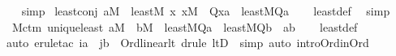 \begin{isabellebody}
\ \ \isamarkupfalse%
\ simp%
\endisatagproof
{\isafoldproof}%
%
\isadelimproof
\isanewline
%
\endisadelimproof
\isanewline
{}\isamarkupfalse%
\ least{\isacharunderscore}{\kern0pt}conj{\isacharcolon}{\kern0pt}\ {\isachardoublequoteopen}a{\isasymin}M\ {\isasymLongrightarrow}\ least{\isacharparenleft}{\kern0pt}{\isacharhash}{\kern0pt}{\isacharhash}{\kern0pt}M{\isacharcomma}{\kern0pt}\ {\isasymlambda}x{\isachardot}{\kern0pt}\ x{\isasymin}M\ {\isasymand}\ Q{\isacharparenleft}{\kern0pt}x{\isacharparenright}{\kern0pt}{\isacharcomma}{\kern0pt}a{\isacharparenright}{\kern0pt}\ {\isasymlongleftrightarrow}\ least{\isacharparenleft}{\kern0pt}{\isacharhash}{\kern0pt}{\isacharhash}{\kern0pt}M{\isacharcomma}{\kern0pt}Q{\isacharcomma}{\kern0pt}a{\isacharparenright}{\kern0pt}{\isachardoublequoteclose}\isanewline
%
\isadelimproof
\ \ %
\endisadelimproof
%
\isatagproof
{}\isamarkupfalse%
\ least{\isacharunderscore}{\kern0pt}def\ \isamarkupfalse%
\ simp%
\endisatagproof
{\isafoldproof}%
%
\isadelimproof
\isanewline
%
\endisadelimproof
\isanewline
\isanewline
{}\isamarkupfalse%
\ {\isacharparenleft}{\kern0pt}\ M{\isacharunderscore}{\kern0pt}ctm{\isacharparenright}{\kern0pt}\ unique{\isacharunderscore}{\kern0pt}least{\isacharcolon}{\kern0pt}\ {\isachardoublequoteopen}a{\isasymin}M\ {\isasymLongrightarrow}\ b{\isasymin}M\ {\isasymLongrightarrow}\ least{\isacharparenleft}{\kern0pt}{\isacharhash}{\kern0pt}{\isacharhash}{\kern0pt}M{\isacharcomma}{\kern0pt}Q{\isacharcomma}{\kern0pt}a{\isacharparenright}{\kern0pt}\ {\isasymLongrightarrow}\ least{\isacharparenleft}{\kern0pt}{\isacharhash}{\kern0pt}{\isacharhash}{\kern0pt}M{\isacharcomma}{\kern0pt}Q{\isacharcomma}{\kern0pt}b{\isacharparenright}{\kern0pt}\ {\isasymLongrightarrow}\ a{\isacharequal}{\kern0pt}b{\isachardoublequoteclose}\isanewline
%
\isadelimproof
\ \ %
\endisadelimproof
%
\isatagproof
{}\isamarkupfalse%
\ least{\isacharunderscore}{\kern0pt}def\isanewline
\ \ \isamarkupfalse%
\ {\isacharparenleft}{\kern0pt}auto{\isacharcomma}{\kern0pt}\ erule{\isacharunderscore}{\kern0pt}tac\ i{\isacharequal}{\kern0pt}a\ \ j{\isacharequal}{\kern0pt}b\ \ Ord{\isacharunderscore}{\kern0pt}linear{\isacharunderscore}{\kern0pt}lt{\isacharsemicolon}{\kern0pt}\ {\isacharparenleft}{\kern0pt}drule\ ltD\ {\isacharbar}{\kern0pt}\ simp{\isacharparenright}{\kern0pt}{\isacharsemicolon}{\kern0pt}\ auto\ intro{\isacharcolon}{\kern0pt}Ord{\isacharunderscore}{\kern0pt}in{\isacharunderscore}{\kern0pt}Ord{\isacharparenright}{\kern0pt}%

\end{isabellebody}
